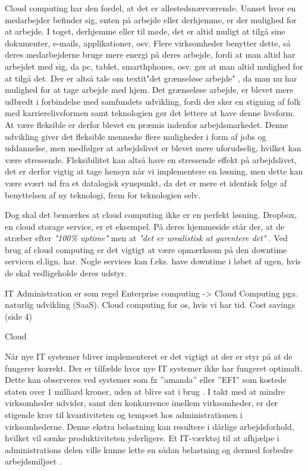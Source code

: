 Cloud computing har den fordel, at det er allestedsnærværende. Uanset hvor en medarbejder befinder sig, enten på arbejde eller derhjemme, er der mulighed for at arbejde. I toget, derhjemme eller til møde, det er altid muligt at tilgå sine dokumenter, e-mails, applikationer, osv. Flere virksomheder benytter dette, så deres medarbejderne bruge mere energi på deres arbejde, fordi at man altid har arbejdet med sig, da pc, tablet, smarthphones, osv. gør at man altid mulighed for at tilgå det. Der er altså tale om textit{"det grænseløse arbejde"} \citep{SystimeStress}, da man nu har mulighed for at tage arbejde med hjem. Det grænseløse arbejde, er blevet mere udbredt i forbindelse med samfundets udvikling, fordi der sker en stigning af folk med karrierelivsformen samt teknologien gør det lettere at have denne livsform. At være fleksible er derfor blevet en præmis indenfor arbejdsmarkedet. Denne udvikling giver det fleksible menneske flere muligheder i form af jobs og uddannelse, men medfølger at arbejdslivet er blevet mere uforudselig, hvilket kan være stressende. Fleksibilitet kan altså have en stressende effekt på arbejdslivet, det er derfor vigtig at tage hensyn når vi implementere en løsning, men dette kan være svært ud fra et datalogisk synspunkt, da det er mere et identisk følge af benyttelsen af ny teknologi, frem for teknologien selv. \citep{SystimeStress} 

Dog skal det bemærkes at cloud computing ikke er en perfekt løsning. Dropbox, en cloud storage service, er et eksempel. På deres hjemmeside står der, at de stræber efter \textit{"100\% uptime"} men at \textit{"det er urealistisk at garentere det"} \citep{drpbx_downtime}. Ved brug af cloud computing er det vigtigt at være opmærksom på den downtime servicen el.lign. har. Nogle services kan f.eks. have downtime i løbet af ugen, hvis de skal vedligeholde deres udstyr.

IT Administration er som regel Enterprise computing ->
Cloud Computing pga. naturlig udvikling (SaaS). 
Cloud computing for os, hvis vi har tid.
Cost savings (side 4)


Cloud

Når nye IT systemer bliver implementeret er det vigtigt at der er styr på at de fungerer korrekt. Der er tilfælde hvor nye IT systemer ikke har fungeret optimalt. Dette kan observeres ved systemer som fx ”amanda” eller ”EFI” som kostede staten over 1 milliard kroner, uden at blive sat i brug \citep{DrItsys}.  I takt med at mindre virksomheder udvider, samt den konkurrence imellem virksomheder, er der stigende krav til kvantiviteten og tempoet hos administrationen i virksomhederne. Denne ekstra belastning kan resultere i dårlige arbejdsforhold, hvilket vil sænke produktiviteten yderligere. Et IT-værktøj til at afhjælpe i administrations delen ville kunne lette en sådan belastning og dermed forbedre arbejdsmiljøet \citep{It_armil}. 

